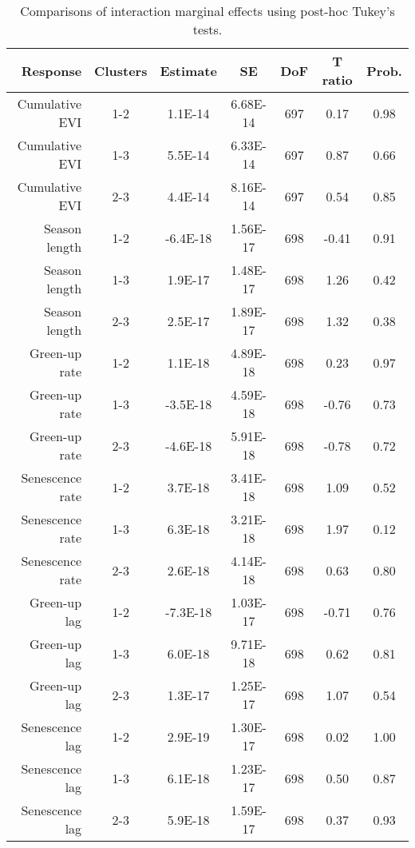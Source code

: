 \begin{table}[H]
\centering
\begin{tabular}{rcccccc}
  \hline
Response & Clusters & Estimate & SE & DoF & T ratio & Prob. \\ 
  \hline
Cumulative EVI & 1-2 & 1.1E-14 & 6.68E-14 & 697 & 0.17 & 0.98 \\ 
  Cumulative EVI & 1-3 & 5.5E-14 & 6.33E-14 & 697 & 0.87 & 0.66 \\ 
  Cumulative EVI & 2-3 & 4.4E-14 & 8.16E-14 & 697 & 0.54 & 0.85 \\ 
   \hline
Season length & 1-2 & -6.4E-18 & 1.56E-17 & 698 & -0.41 & 0.91 \\ 
  Season length & 1-3 & 1.9E-17 & 1.48E-17 & 698 & 1.26 & 0.42 \\ 
  Season length & 2-3 & 2.5E-17 & 1.89E-17 & 698 & 1.32 & 0.38 \\ 
   \hline
Green-up rate & 1-2 & 1.1E-18 & 4.89E-18 & 698 & 0.23 & 0.97 \\ 
  Green-up rate & 1-3 & -3.5E-18 & 4.59E-18 & 698 & -0.76 & 0.73 \\ 
  Green-up rate & 2-3 & -4.6E-18 & 5.91E-18 & 698 & -0.78 & 0.72 \\ 
   \hline
Senescence rate & 1-2 & 3.7E-18 & 3.41E-18 & 698 & 1.09 & 0.52 \\ 
  Senescence rate & 1-3 & 6.3E-18 & 3.21E-18 & 698 & 1.97 & 0.12 \\ 
  Senescence rate & 2-3 & 2.6E-18 & 4.14E-18 & 698 & 0.63 & 0.80 \\ 
   \hline
Green-up lag & 1-2 & -7.3E-18 & 1.03E-17 & 698 & -0.71 & 0.76 \\ 
  Green-up lag & 1-3 & 6.0E-18 & 9.71E-18 & 698 & 0.62 & 0.81 \\ 
  Green-up lag & 2-3 & 1.3E-17 & 1.25E-17 & 698 & 1.07 & 0.54 \\ 
   \hline
Senescence lag & 1-2 & 2.9E-19 & 1.30E-17 & 698 & 0.02 & 1.00 \\ 
  Senescence lag & 1-3 & 6.1E-18 & 1.23E-17 & 698 & 0.50 & 0.87 \\ 
  Senescence lag & 2-3 & 5.9E-18 & 1.59E-17 & 698 & 0.37 & 0.93 \\ 
  \end{tabular}
\caption{Comparisons of interaction marginal effects using post-hoc Tukey's tests.} 
\label{lsq_terms}
\end{table}

